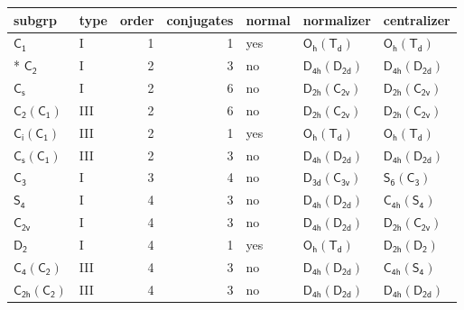 \documentclass[10pt,a4paper]{article}
\numberwithin{equation}{section}
\newcommand{\grp}[1]{\mathsf{#1}}
\begin{document}
{\small\begin{longtable}{@{}llrrlll@{}}\toprule
subgrp & type & order & conjugates & normal & normalizer & centralizer\\\midrule\endhead
\bottomrule\endfoot\endlastfoot
\href{../../../rotation/data/pdf/C1.pdf}{$\grp{C_{1}}$} & I & 1 & 1 & yes & \href{Oh-Td.pdf}{$\grp{O_{h}}(\grp{T_{d}})$} & \href{Oh-Td.pdf}{$\grp{O_{h}}(\grp{T_{d}})$}\\*
\href{../../../rotation/data/pdf/C2.pdf}{$\grp{C_{2}}$} & I & 2 & 3 & no & \href{D4h-D2d.pdf}{$\grp{D_{4h}}(\grp{D_{2d}})$} & \href{D4h-D2d.pdf}{$\grp{D_{4h}}(\grp{D_{2d}})$}\\
\href{../../../rotation/data/pdf/C1v.pdf}{$\grp{C_{s}}$} & I & 2 & 6 & no & \href{D2h-C2v.pdf}{$\grp{D_{2h}}(\grp{C_{2v}})$} & \href{D2h-C2v.pdf}{$\grp{D_{2h}}(\grp{C_{2v}})$}\\
\href{C2-C1.pdf}{$\grp{C_{2}}(\grp{C_{1}})$} & III & 2 & 6 & no & \href{D2h-C2v.pdf}{$\grp{D_{2h}}(\grp{C_{2v}})$} & \href{D2h-C2v.pdf}{$\grp{D_{2h}}(\grp{C_{2v}})$}\\
\href{S2-C1.pdf}{$\grp{C_{i}}(\grp{C_{1}})$} & III & 2 & 1 & yes & \href{Oh-Td.pdf}{$\grp{O_{h}}(\grp{T_{d}})$} & \href{Oh-Td.pdf}{$\grp{O_{h}}(\grp{T_{d}})$}\\
\href{C1v-C1.pdf}{$\grp{C_{s}}(\grp{C_{1}})$} & III & 2 & 3 & no & \href{D4h-D2d.pdf}{$\grp{D_{4h}}(\grp{D_{2d}})$} & \href{D4h-D2d.pdf}{$\grp{D_{4h}}(\grp{D_{2d}})$}\\
\href{../../../rotation/data/pdf/C3.pdf}{$\grp{C_{3}}$} & I & 3 & 4 & no & \href{D3d-C3v.pdf}{$\grp{D_{3d}}(\grp{C_{3v}})$} & \href{S6-C3.pdf}{$\grp{S_{6}}(\grp{C_{3}})$}\\
\href{../../../rotation/data/pdf/S4.pdf}{$\grp{S_{4}}$} & I & 4 & 3 & no & \href{D4h-D2d.pdf}{$\grp{D_{4h}}(\grp{D_{2d}})$} & \href{C4h-S4.pdf}{$\grp{C_{4h}}(\grp{S_{4}})$}\\
\href{../../../rotation/data/pdf/C2v.pdf}{$\grp{C_{2v}}$} & I & 4 & 3 & no & \href{D4h-D2d.pdf}{$\grp{D_{4h}}(\grp{D_{2d}})$} & \href{D2h-C2v.pdf}{$\grp{D_{2h}}(\grp{C_{2v}})$}\\
\href{../../../rotation/data/pdf/D2.pdf}{$\grp{D_{2}}$} & I & 4 & 1 & yes & \href{Oh-Td.pdf}{$\grp{O_{h}}(\grp{T_{d}})$} & \href{D2h-D2.pdf}{$\grp{D_{2h}}(\grp{D_{2}})$}\\
\href{C4-C2.pdf}{$\grp{C_{4}}(\grp{C_{2}})$} & III & 4 & 3 & no & \href{D4h-D2d.pdf}{$\grp{D_{4h}}(\grp{D_{2d}})$} & \href{C4h-S4.pdf}{$\grp{C_{4h}}(\grp{S_{4}})$}\\
\href{C2h-C2.pdf}{$\grp{C_{2h}}(\grp{C_{2}})$} & III & 4 & 3 & no & \href{D4h-D2d.pdf}{$\grp{D_{4h}}(\grp{D_{2d}})$} & \href{D4h-D2d.pdf}{$\grp{D_{4h}}(\grp{D_{2d}})$}\\

\end{longtable}}
\end{document}
